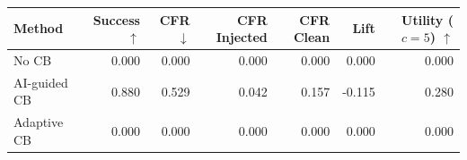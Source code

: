 \begin{tabular}{lrrrrrr}
\toprule
Method & Success $\uparrow$ & CFR $\downarrow$ & CFR Injected & CFR Clean & Lift & Utility ($c=5$) $\uparrow$ \\
\midrule
No CB & 0.000 & 0.000 & 0.000 & 0.000 & 0.000 & 0.000 \\
AI-guided CB & 0.880 & 0.529 & 0.042 & 0.157 & -0.115 & 0.280 \\
Adaptive CB & 0.000 & 0.000 & 0.000 & 0.000 & 0.000 & 0.000 \\
\bottomrule
\end{tabular}
